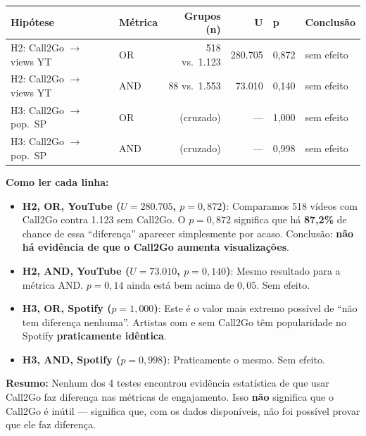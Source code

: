 \documentclass[12pt,a4paper]{article}
\newcommand{\num}[1]{\textcolor{azul}{\textbf{#1}}}
\newcommand{\alerta}[1]{\textcolor{laranja}{\textbf{#1}}}
\begin{document}
\medskip
\begin{center}
\begin{tabular}{llrrll}
\toprule
\textbf{Hipótese} & \textbf{Métrica} & \textbf{Grupos (n)} & \textbf{U} &
  \textbf{p} & \textbf{Conclusão} \\
\midrule
H2: Call2Go $\to$ views YT & OR  & 518 vs.\ 1.123 & 280.705 & 0,872 & sem efeito \\
H2: Call2Go $\to$ views YT & AND & 88  vs.\ 1.553 & 73.010  & 0,140 & sem efeito \\
H3: Call2Go $\to$ pop.\ SP & OR  & (cruzado)      & ---     & 1,000 & sem efeito \\
H3: Call2Go $\to$ pop.\ SP & AND & (cruzado)      & ---     & 0,998 & sem efeito \\
\bottomrule
\end{tabular}
\end{center}
\medskip

\textbf{Como ler cada linha:}

\begin{itemize}
  \item \textbf{H2, OR, YouTube ($U = 280.705$, $p = 0{,}872$)}: Comparamos
        518 vídeos com Call2Go contra 1.123 sem Call2Go. O $p = 0{,}872$
        significa que há \num{87,2\%} de chance de essa ``diferença'' aparecer
        simplesmente por acaso. Conclusão: \alerta{não há evidência de que o
        Call2Go aumenta visualizações}.

  \item \textbf{H2, AND, YouTube ($U = 73.010$, $p = 0{,}140$)}: Mesmo
        resultado para a métrica AND. $p = 0{,}14$ ainda está bem acima de
        $0{,}05$. Sem efeito.

  \item \textbf{H3, OR, Spotify ($p = 1{,}000$)}: Este é o valor mais extremo
        possível de ``não tem diferença nenhuma''. Artistas com e sem Call2Go
        têm popularidade no Spotify \textbf{praticamente idêntica}.

  \item \textbf{H3, AND, Spotify ($p = 0{,}998$)}: Praticamente o mesmo. Sem
        efeito.
\end{itemize}

\textbf{Resumo:} Nenhum dos 4 testes encontrou evidência estatística de que
usar Call2Go faz diferença nas métricas de engajamento. Isso \textbf{não}
significa que o Call2Go é inútil --- significa que, com os dados disponíveis,
não foi possível provar que ele faz diferença.
\end{document}
